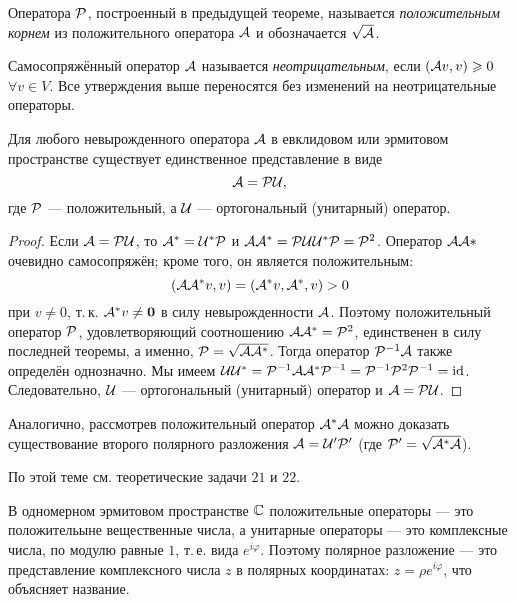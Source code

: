 \begin{definition}
    Оператора $\P$, построенный в предыдущей теореме, называется \textit{положительным корнем} из положительного оператора $\A$ и обозначается $\sqrt{\A}$.
\end{definition}

\begin{definition}
    Самосопряжённый оператор $\A$ называется \textit{неотрицательным}, если $(\A v, v) \geqslant 0$ $\forall v \in V$. Все утверждения выше переносятся без изменений на неотрицательные операторы.
\end{definition}

\begin{theorem}
    Для любого невырожденного оператора $\A$ в евклидовом или эрмитовом пространстве существует единственное представление в виде
    \[
        \A = \P\U,
    \]
    где $\P$ --- положительный, а $\U$ --- ортогональный (унитарный) оператор.
\end{theorem}

\begin{proof}
    Если $\A = \P\U$, то $\A^\ast = \U^\ast\P$ и $\A\A^\ast = \P\U\U^\ast\P = \P^2$. Оператор $\A\A\ast$ очевидно самосопряжён; кроме того, он является положительным:
    \[
        (\A\A^\ast v, v) = (\A^\ast v, \A^\ast, v) > 0
    \]
    при $v \ne 0$, т.\,к. $\A^\ast v \ne \bs{0}$ в силу невырожденности $\A$. Поэтому положительный оператор $\P$, удовлетворяющий соотношению $\A\A^\ast = \P^2$, единственен в силу последней теоремы, а именно, $\P = \sqrt{\A\A^\ast}$. Тогда оператор $\P^{-1}\A$ также определён однозначно. Мы имеем $\U\U^\ast = \P^{-1}\A\A^\ast\P^{-1} = \P^{-1}\P^2\P^{-1} = \id$. Следовательно, $\U$ --- ортогональный (унитарный) оператор и $\A = \P\U$.
\end{proof}

Аналогично, рассмотрев положительный оператор $\A^\ast\A$ можно доказать существование второго полярного разложения $\A = \U^\prime\P^\prime$ (где $\P^\prime = \sqrt{\A^\ast\A}$).

По этой теме см. теоретические задачи $21$ и $22$.

В одномерном эрмитовом пространстве $\C$ положительные операторы --- это положительыне вещественные числа, а унитарные операторы --- это комплексные числа, по модулю равные $1$, т.\,е. вида $e^{i\varphi}$. Поэтому полярное разложение --- это представление комплексного числа $z$ в полярных координатах: $z = \rho e^{i\varphi}$, что объясняет название.


